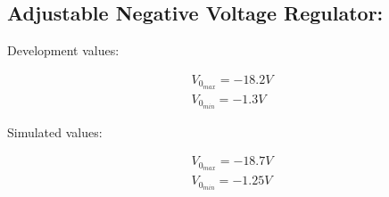 \subsection{Adjustable Negative Voltage Regulator:}

\begin{multicols}{2}
\begin{tasks}
\task Development values:

\begin{ceqn}
\begin{align}
V_{0_{max}} = -18.2 V \\
V_{0_{min}} = -1.3 V
\end{align}
\end{ceqn}

\task Simulated values:

\begin{ceqn}
\begin{align}
V_{0_{max}} = -18.7 V \\
V_{0_{min}} = -1.25 V
\end{align}
\end{ceqn}
\end{tasks}
\end{multicols}

\pagebreak